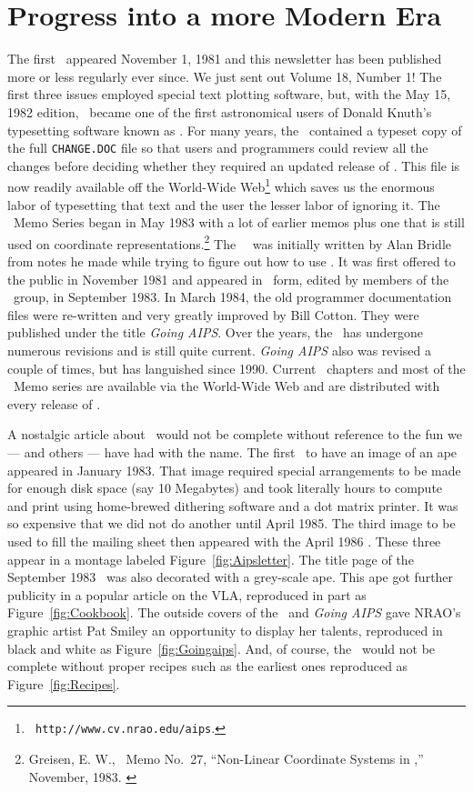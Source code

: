 \section{Progress into a more Modern Era}

The first \Aipsletter\ appeared November 1, 1981 and this newsletter
has been published more or less regularly ever since.  We just sent
out Volume 18, Number 1!   The first three issues employed special
text plotting software, but, with the May 15, 1982 edition, \AIPS\
became one of the first astronomical users of Donald Knuth's
typesetting software known as \TEX.  For many years, the \Aipsletter\
contained a typeset copy of the full {\tt CHANGE.DOC} file so that
users and programmers could review all the changes before deciding
whether they required an updated release of \hbox{\AIPS}.  This file
is now readily available off the World-Wide Web\footnote{{\tt
http://www.cv.nrao.edu/aips}.} which saves us the enormous labor of
typesetting that text and the user the lesser labor of ignoring it.
The \AIPS\ Memo Series began in May 1983 with a lot of earlier memos
plus one that is still used on coordinate
representations.\footnote{Greisen, E. W., \AIPS\ Memo No.~27,
``Non-Linear Coordinate Systems in \AIPS,'' November, 1983.
\label{fn:G1983}}  The \AIPS\ \Cookbook\ was initially written by Alan
Bridle from notes he made while trying to figure out how to use
\hbox{\RANCID}.  It was first offered to the public in November 1981
and appeared in \TEX\ form, edited by members of the \AIPS\ group, in
September 1983.  In March 1984, the old programmer documentation files
were re-written and very greatly improved by Bill Cotton.  They were
published under the title {\it Going \hbox{AIPS}}.  Over the years,
the \Cookbook\ has undergone numerous revisions and is still quite
current.  {\it Going AIPS} also was revised a couple of times, but has
languished since 1990.  Current \Cookbook\ chapters and most of the
\AIPS\ Memo series are available via the World-Wide Web and are
distributed with every release of \hbox{\AIPS}.

A nostalgic article about \AIPS\ would not be complete without
reference to the fun we --- and others --- have had with the name.
The first \Aipsletter\ to have an image of an ape appeared in January
1983.  That image required special arrangements to be made for enough
disk space (say 10 Megabytes) and took literally hours to compute and
print using home-brewed dithering software and a dot matrix printer.
It was so expensive that we did not do another until April 1985.  The
third image to be used to fill the mailing sheet then appeared with
the April 1986 \Aipsletter.  These three appear in a montage labeled
Figure~\ref{fig:Aipsletter}.  The title page of the September 1983
\Cookbook\ was also decorated with a grey-scale ape.  This ape got
further publicity in a popular article on the VLA, reproduced in part
as Figure~\ref{fig:Cookbook}.  The outside covers of the \Cookbook\
and {\it Going AIPS} gave NRAO's graphic artist Pat Smiley an
opportunity to display her talents, reproduced in black and white as
Figure~\ref{fig:Goingaips}.  And, of course, the \Cookbook\ would not
be complete without proper recipes such as the earliest ones reproduced
as Figure~\ref{fig:Recipes}.

